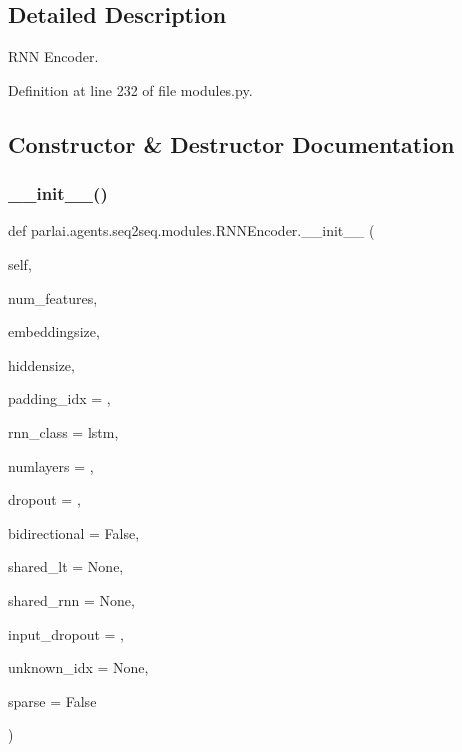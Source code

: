 \subsection{Detailed Description}
\begin{DoxyVerb}RNN Encoder.
\end{DoxyVerb}
 

Definition at line 232 of file modules.\+py.



\subsection{Constructor \& Destructor Documentation}
\mbox{\label{classparlai_1_1agents_1_1seq2seq_1_1modules_1_1RNNEncoder_a16b286b0c62255fe349789ea576afdb0}} 
\subsubsection{\texorpdfstring{\+\_\+\+\_\+init\+\_\+\+\_\+()}{\_\_init\_\_()}}
{\footnotesize\ttfamily def parlai.\+agents.\+seq2seq.\+modules.\+R\+N\+N\+Encoder.\+\_\+\+\_\+init\+\_\+\+\_\+ (\begin{DoxyParamCaption}\item[{}]{self,  }\item[{}]{num\+\_\+features,  }\item[{}]{embeddingsize,  }\item[{}]{hiddensize,  }\item[{}]{padding\+\_\+idx = {},  }\item[{}]{rnn\+\_\+class = {\ttfamily \textquotesingle{}lstm\textquotesingle{}},  }\item[{}]{numlayers = {},  }\item[{}]{dropout = {},  }\item[{}]{bidirectional = {\ttfamily False},  }\item[{}]{shared\+\_\+lt = {\ttfamily None},  }\item[{}]{shared\+\_\+rnn = {\ttfamily None},  }\item[{}]{input\+\_\+dropout = {},  }\item[{}]{unknown\+\_\+idx = {\ttfamily None},  }\item[{}]{sparse = {\ttfamily False} }\end{DoxyParamCaption})}

